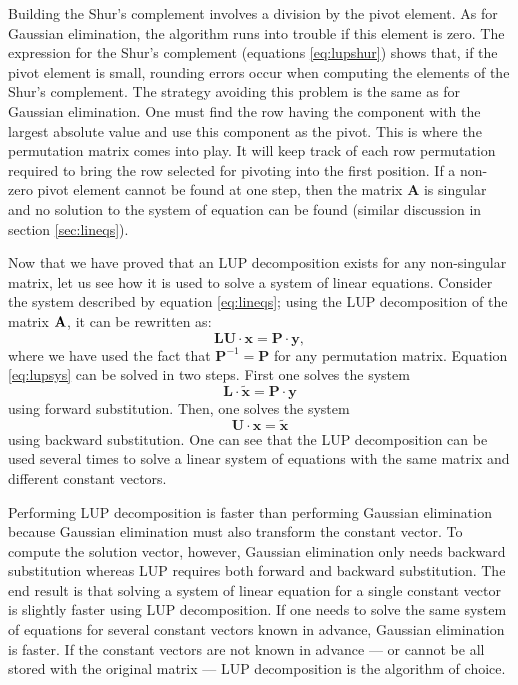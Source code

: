 Building the Shur's complement involves a division by the pivot
element. As for Gaussian elimination, the algorithm runs into
trouble if this element is zero. The expression for the Shur's
complement (equations \ref{eq:lupshur}) shows that, if the pivot
element is small, rounding errors occur when computing the
elements of the Shur's complement. The strategy avoiding this
problem is the same as for Gaussian elimination. One must find the
row having the component with the largest absolute value and use
this component as the pivot. This is where the permutation matrix
comes into play. It will keep track of each row permutation
required to bring the row selected for pivoting into the first
position. If a non-zero pivot element cannot be found at one step,
then the matrix $\textbf{A}$ is singular and no solution to the
system of equation can be found (\cf similar discussion in section
\ref{sec:lineqs}).

Now that we have proved that an LUP decomposition exists for any
non-singular matrix, let us see how it is used to solve a system
of linear equations. Consider the system described by equation
\ref{eq:lineqs}; using the LUP decomposition of the matrix ${\textbf
A}$, it can be rewritten as:
\begin{equation}
\label{eq:lupsys}
  \textbf{L}\textbf{U}\cdot\textbf{x}=\textbf{P}\cdot\textbf{y},
\end{equation}
where we have used the fact that $\textbf{P}^{-1}=\textbf{P}$ for any
permutation matrix. Equation \ref{eq:lupsys} can be solved in two
steps. First one solves the system
\begin{equation}
\label{eq:lupforward}
  \textbf{L}\cdot\tilde{\textbf{x}}=\textbf{P}\cdot\textbf{y}
\end{equation}
using forward substitution. Then, one solves the system
\begin{equation}
\label{eq:lupbackward}
  \textbf{U}\cdot\textbf{x}=\tilde{\textbf{x}}
\end{equation}
using backward substitution. One can see that the LUP
decomposition can be used several times to solve a linear system
of equations with the same matrix and different constant vectors.

Performing LUP decomposition is faster than performing Gaussian
elimination because Gaussian elimination must also transform the
constant vector. To compute the solution vector, however, Gaussian
elimination only needs backward substitution whereas LUP requires
both forward and backward substitution. The end result is that
solving a system of linear equation for a single constant vector
is slightly faster using LUP decomposition. If one needs to solve
the same system of equations for several constant vectors known in
advance, Gaussian elimination is faster. If the constant vectors
are not known in advance --- or cannot be all stored with the
original matrix --- LUP decomposition is the algorithm of choice.

